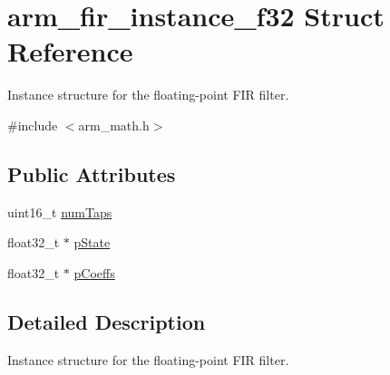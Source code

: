 \hypertarget{structarm__fir__instance__f32}{\section{arm\-\_\-fir\-\_\-instance\-\_\-f32 Struct Reference}
\label{structarm__fir__instance__f32}
}


Instance structure for the floating-\/point F\-I\-R filter.  




{\ttfamily \#include $<$arm\-\_\-math.\-h$>$}

\subsection*{Public Attributes}
\begin{DoxyCompactItemize}
\item 
uint16\-\_\-t \hyperlink{structarm__fir__instance__f32_a20cf98c92b5323799b7881c9ff4d2f7c}{num\-Taps}
\item 
float32\-\_\-t $\ast$ \hyperlink{structarm__fir__instance__f32_a7afcf4022e8560db9b8fd28b0d090a15}{p\-State}
\item 
float32\-\_\-t $\ast$ \hyperlink{structarm__fir__instance__f32_a1c9cfca901d5902afeb640f2831488f4}{p\-Coeffs}
\end{DoxyCompactItemize}


\subsection{Detailed Description}
Instance structure for the floating-\/point F\-I\-R filter. 

